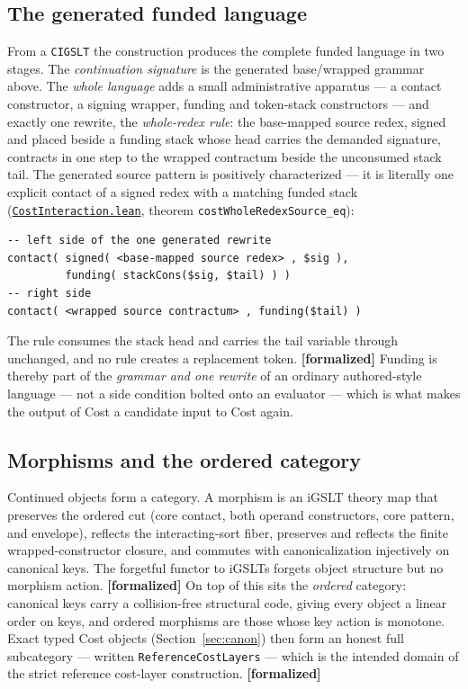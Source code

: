 \documentclass[11pt]{article}
\newcommand{\leanfile}[2]{\href{https://github.com/zariuq/MeTTapedia/blob/main/lean/mettapedia/Mettapedia/#1}{\code{#2}}}
\newcommand{\code}[1]{\texttt{#1}}
\newcommand{\formalized}{\textbf{[formalized]}}
\begin{document}
\subsection{The generated funded language}
\label{sec:genfunded}

From a \code{CIGSLT} the construction produces the complete funded
language in two stages.  The \emph{continuation signature} is the
generated base/wrapped grammar above.  The \emph{whole language} adds a
small administrative apparatus --- a contact constructor, a signing
wrapper, funding and token-stack constructors --- and exactly one
rewrite, the \emph{whole-redex rule}: the base-mapped source redex,
signed and placed beside a funding stack whose head carries the demanded
signature, contracts in one step to the wrapped contractum beside the
unconsumed stack tail.  The generated source pattern is positively
characterized --- it is literally one explicit contact of a signed redex
with a matching funded stack
(\leanfile{GSLT/LanguageDef/CostInteraction.lean}{CostInteraction.lean},
theorem \code{costWholeRedexSource\_eq}):

\begin{lstlisting}
-- left side of the one generated rewrite
contact( signed( <base-mapped source redex> , $sig ),
         funding( stackCons($sig, $tail) ) )
-- right side
contact( <wrapped source contractum> , funding($tail) )
\end{lstlisting}

\noindent
The rule consumes the stack head and carries the tail variable through
unchanged, and no rule creates a replacement token. \formalized{} Funding is thereby part of the
\emph{grammar and one rewrite} of an ordinary authored-style language ---
not a side condition bolted onto an evaluator --- which is what makes the
output of Cost a candidate input to Cost again.

\subsection{Morphisms and the ordered category}

Continued objects form a category.  A morphism is an iGSLT theory map
that preserves the ordered cut (core contact, both operand constructors,
core pattern, and envelope), reflects the interacting-sort fiber,
preserves and reflects the finite wrapped-constructor closure, and
commutes with canonicalization injectively on canonical keys.  The
forgetful functor to iGSLTs forgets object structure but no morphism
action. \formalized{} On top of this sits the \emph{ordered} category:
canonical keys carry a collision-free structural code, giving every
object a linear order on keys, and ordered morphisms are those whose
key action is monotone.  Exact typed Cost objects
(Section~\ref{sec:canon}) then form an honest full subcategory ---
written \code{ReferenceCostLayers} --- which is the intended domain of the
strict reference cost-layer construction. \formalized
\end{document}
